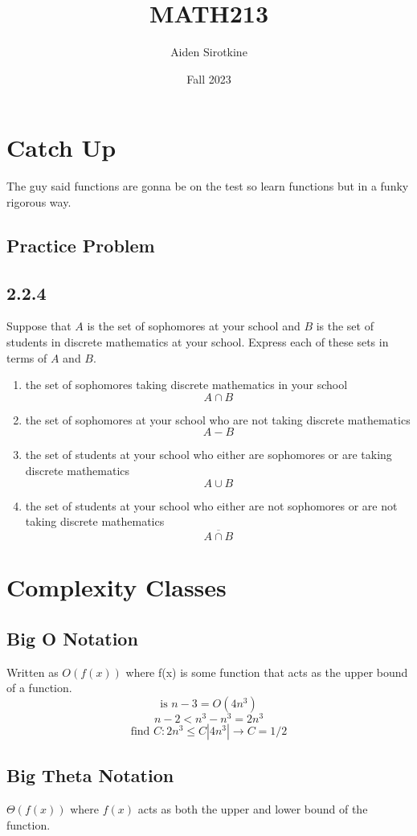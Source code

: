 \documentclass{report}
\date{Fall 2023}
\title{MATH213}
\author{Aiden Sirotkine}
\begin{document}
\maketitle{}

\tableofcontents

\chapter{Catch Up}

The guy said functions are gonna be on the test so learn functions but in a funky rigorous way.

\section{Practice Problem}
\section*{2.2.4}
Suppose that $A$ is the set of sophomores at your school
and $B$ is the set of students in discrete mathematics at
your school. Express each of these sets in terms of $A$ and
$B$.
\begin{enumerate}[label = (\alph*)]
\item
the set of sophomores taking discrete mathematics in your school
\[
A \cap B
\]
\item
the set of sophomores at your school who are not taking discrete mathematics
\[
A - B
\]
\item
the set of students at your school who either are sophomores or are taking discrete mathematics
\[
A \cup B
\]
\item
the set of students at your school who either are not sophomores or are not taking discrete mathematics
\[
\overline{A \cap B}
\]
\end{enumerate}
\chapter{Complexity Classes}
\section{Big O Notation}
Written as $O(f(x))$ where f(x) is some function that acts as the upper bound of a function.
\[
\textrm{is } n-3 = O(4n^3)
\]
\[
n-2 < n^3 - n^3 = 2n^3
\]
\[
\textrm{find } C: 2n^3 \leq C|4n^3|
\longrightarrow
C = 1/2 
\]


\section{Big Theta Notation}
$\Theta (f(x))$ where $f(x)$ acts as both the upper and lower bound of the function.
\end{document}
